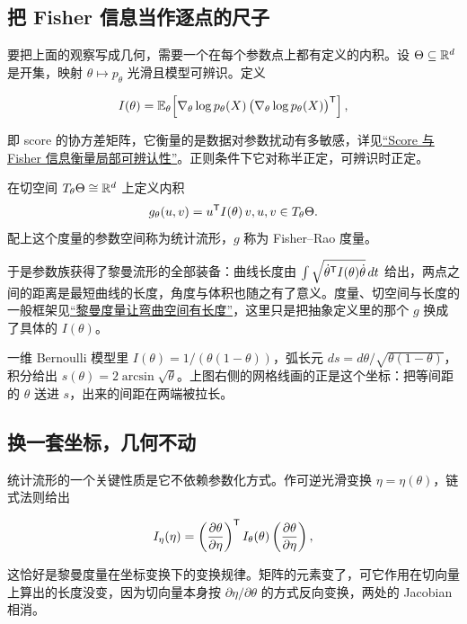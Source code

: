 \subsection{把 Fisher 信息当作逐点的尺子}

要把上面的观察写成几何，需要一个在每个参数点上都有定义的内积。设 \(\Theta\subseteq\mathbb{R}^d\) 是开集，映射 \(\theta\mapsto p_\theta\) 光滑且模型可辨识。定义

\[
I(\theta)=\mathbb{E}_\theta\!\left[
\nabla_\theta\log p_\theta(X)\,
\bigl(\nabla_\theta\log p_\theta(X)\bigr)^{\mathsf{T}}
\right],
\]

即 score 的协方差矩阵，它衡量的是数据对参数扰动有多敏感，详见\hyperref[sec:11-Mathematical-Statistics/03-Sufficient-Statistics-and-Information/02]{``Score 与 Fisher 信息衡量局部可辨认性''}。正则条件下它对称半正定，可辨识时正定。

\begin{definition}
在切空间 \(T_\theta\Theta\cong\mathbb{R}^d\) 上定义内积
\[
g_\theta(u,v)=u^{\mathsf{T}}I(\theta)\,v ,
\space u,v\in T_\theta\Theta .
\]
配上这个度量的参数空间称为统计流形，\(g\) 称为 Fisher--Rao 度量。
\end{definition}

于是参数族获得了黎曼流形的全部装备：曲线长度由 \(\int\sqrt{\dot\theta^{\mathsf{T}}I(\theta)\dot\theta}\,dt\) 给出，两点之间的距离是最短曲线的长度，角度与体积也随之有了意义。度量、切空间与长度的一般框架见\hyperref[sec:12-Real-Analysis-Support/08-Manifold-Basics/03]{``黎曼度量让弯曲空间有长度''}，这里只是把抽象定义里的那个 \(g\) 换成了具体的 \(I(\theta)\)。

一维 Bernoulli 模型里 \(I(\theta)=1/(\theta(1-\theta))\)，弧长元 \(ds=d\theta/\sqrt{\theta(1-\theta)}\)，积分给出 \(s(\theta)=2\arcsin\sqrt{\theta}\)。上图右侧的网格线画的正是这个坐标：把等间距的 \(\theta\) 送进 \(s\)，出来的间距在两端被拉长。

\subsection{换一套坐标，几何不动}

统计流形的一个关键性质是它不依赖参数化方式。作可逆光滑变换 \(\eta=\eta(\theta)\)，链式法则给出

\[
I_\eta(\eta)=
\left(\frac{\partial\theta}{\partial\eta}\right)^{\mathsf{T}}
I_\theta(\theta)
\left(\frac{\partial\theta}{\partial\eta}\right),
\]

这恰好是黎曼度量在坐标变换下的变换规律。矩阵的元素变了，可它作用在切向量上算出的长度没变，因为切向量本身按 \(\partial\eta/\partial\theta\) 的方式反向变换，两处的 Jacobian 相消。

